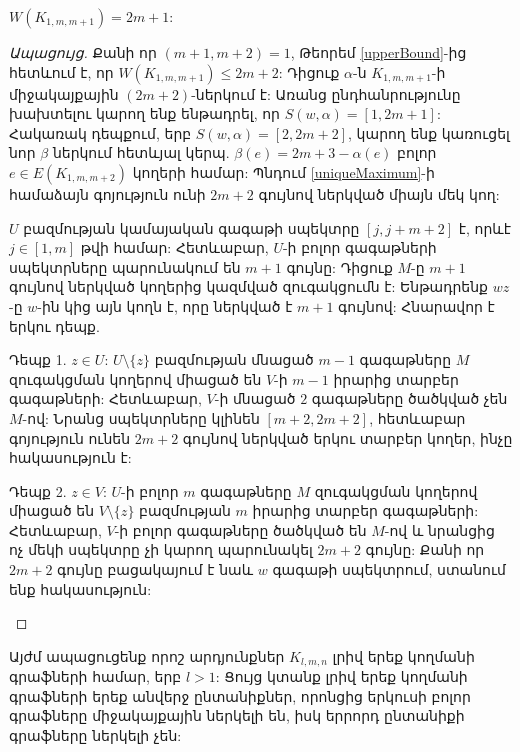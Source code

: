\begin{theorem}
\label{WSymm}
$W(K_{1,m,m+1}) = 2m+1$:
\end{theorem}
\begin{proof}[Ապացույց]
Քանի որ $(m+1,m+2)=1$, Թեորեմ \ref{upperBound}-ից հետևում է, որ $W(K_{1,m,m+1}) \leq 2m+2$: Դիցուք $\alpha$-ն $K_{1,m,m+1}$-ի միջակայքային $(2m+2)$-ներկում է: Առանց ընդհանրությունը խախտելու կարող ենք ենթադրել, որ $S(w,\alpha)=[1,2m+1]$: Հակառակ դեպքում, երբ $S(w,\alpha)=[2,2m+2]$, կարող ենք կառուցել նոր $\beta$ ներկում հետևյալ կերպ. $\beta(e) = 2m+3 - \alpha(e)$ բոլոր $e \in E(K_{1,m,m+2})$ կողերի համար:	Պնդում \ref{uniqueMaximum}-ի համաձայն գոյություն ունի $2m+2$ գույնով ներկված միայն մեկ կող:

$U$ բազմության կամայական գագաթի սպեկտրը $[j, j+m+2]$ է, որևէ $j \in [1, m]$ թվի համար: Հետևաբար, $U$-ի բոլոր գագաթների սպեկտրները պարունակում են $m+1$ գույնը: Դիցուք $M$-ը $m+1$ գույնով ներկված կողերից կազմված զուգակցումն է: Ենթադրենք $wz$-ը $w$-ին կից այն կողն է, որը ներկված է $m+1$ գույնով: Հնարավոր է երկու դեպք.
\begin{description}
\item{Դեպք 1.} $z \in U$: $U\setminus\{z\}$ բազմության մնացած $m-1$ գագաթները $M$ զուգակցման կողերով միացած են $V$-ի $m-1$ իրարից տարբեր գագաթների: Հետևաբար, $V$-ի մնացած $2$ գագաթները ծածկված չեն $M$-ով: Նրանց սպեկտրները կլինեն $[m+2,2m+2]$, հետևաբար գոյություն ունեն $2m+2$ գույնով ներկված երկու տարբեր կողեր, ինչը հակասություն է:
\item{Դեպք 2.} $z \in V$: $U$-ի բոլոր $m$ գագաթները $M$ զուգակցման կողերով միացած են $V \setminus \{z\}$ բազմության $m$ իրարից տարբեր գագաթների: Հետևաբար, $V$-ի բոլոր գագաթները ծածկված են $M$-ով և նրանցից ոչ մեկի սպեկտրը չի կարող պարունակել $2m+2$ գույնը: Քանի որ $2m+2$ գույնը բացակայում է նաև $w$ գագաթի սպեկտրում, ստանում ենք հակասություն:
\end{description}
\end{proof}

Այժմ ապացուցենք որոշ արդյունքներ $K_{l,m,n}$ լրիվ երեք կողմանի գրաֆների համար, երբ $l>1$: Ցույց կտանք լրիվ երեք կողմանի գրաֆների երեք անվերջ ընտանիքներ, որոնցից երկուսի բոլոր գրաֆները միջակայքային ներկելի են, իսկ երրորդ ընտանիքի գրաֆները ներկելի չեն:

